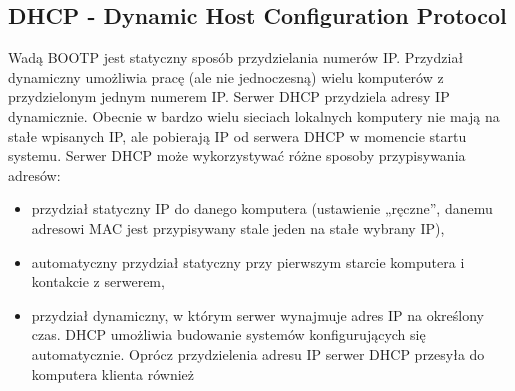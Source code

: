 \documentclass[../main.tex]{subfiles}
\begin{document}
        \subsection{DHCP - Dynamic Host Configuration Protocol}
        Wadą BOOTP jest statyczny sposób przydzielania numerów IP.
        Przydział dynamiczny umożliwia pracę (ale nie jednoczesną) wielu komputerów z
        przydzielonym jednym numerem IP.
        Serwer DHCP przydziela adresy IP dynamicznie. Obecnie w bardzo wielu sieciach lokalnych
        komputery nie mają na stałe wpisanych IP, ale pobierają IP od serwera DHCP w momencie
        startu systemu.
        Serwer DHCP może wykorzystywać różne sposoby przypisywania adresów:
        \begin{itemize}
            \item przydział statyczny IP do danego komputera (ustawienie „ręczne”, danemu adresowi
            MAC jest przypisywany stale jeden na stałe wybrany IP),
            \item automatyczny przydział statyczny przy pierwszym starcie komputera i kontakcie z
            serwerem,
            \item przydział dynamiczny, w którym serwer wynajmuje adres IP na określony czas.
            DHCP umożliwia budowanie systemów konfigurujących się automatycznie.
            Oprócz przydzielenia adresu IP serwer DHCP przesyła do komputera klienta również
        \end{itemize}
\end{document}
